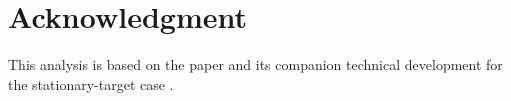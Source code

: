 \section*{Acknowledgment}
This analysis is based on the paper \cite{kou2022cooperative} and its companion technical development
for the stationary-target case \cite{chen2019cooperative}.

